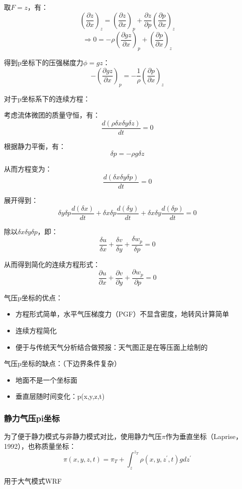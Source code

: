 \documentclass{article}
\begin{document}
取$F = z$，有：
$$(\frac{\partial z}{\partial x})_z = (\frac{\partial z}{\partial x})_p + \frac{\partial z}{\partial p}(\frac{\partial p}{\partial x})_z$$
$$\Rightarrow 0=-\rho (\frac{\partial gz}{\partial x})_p + (\frac{\partial p}{\partial x})_z$$

得到p坐标下的压强梯度力$\phi = gz$：
$$ -(\frac{\partial gz}{\partial x})_p = -\frac{1}{\rho}(\frac{\partial p}{\partial x})_z$$

对于p坐标系下的连续方程：

考虑流体微团的质量守恒，有：
$$\frac{d(\rho\delta x\delta y\delta z)}{dt} = 0$$

根据静力平衡，有：
$$\delta p = -\rho g\delta z$$

从而方程变为：
$$\frac{d(\delta x\delta y\delta p)}{dt} = 0$$

展开得到：
$$\delta y\delta p\frac{d(\delta x)}{dt} + \delta x\delta p\frac{d(\delta y)}{dt}+\delta x\delta y\frac{d(\delta p)}{dt}= 0$$

除以$\delta x\delta y\delta p$，即：
$$\frac{\delta u}{\delta x} + \frac{\delta v}{\delta y}+\frac{\delta w_p}{\delta p}= 0$$

从而得到简化的连续方程形式：
$$\frac{\partial u}{\partial x} + \frac{\partial v}{\partial y}+\frac{\partial w_p}{\partial p}= 0$$

气压p坐标的优点：
\begin{itemize}
    \item 方程形式简单，水平气压梯度力（PGF）不显含密度，地转风计算简单
    \item 连续方程简化
    \item 便于与传统天气分析结合做预报：天气图正是在等压面上绘制的
\end{itemize}

气压p坐标的缺点：（下边界条件复杂）
\begin{itemize}
    \item 地面不是一个坐标面
    \item 垂直层随时间变化：p(x,y,z,t)
\end{itemize}

\subsubsection{静力气压pi坐标}
为了便于静力模式与非静力模式对比，使用静力气压$\pi$作为垂直坐标（Laprise，1992），也称质量坐标：
$$\pi(x,y,z,t)=\pi_T+\int^{z_T}_{z}{\rho(x,y,z^{\prime},t)g} dz^{\prime}$$

用于大气模式WRF
\end{document}
